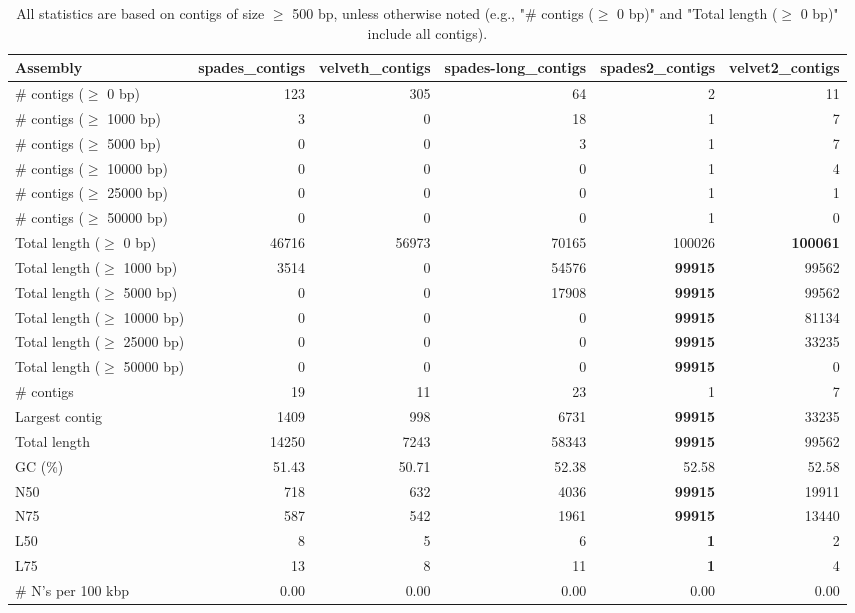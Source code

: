 \documentclass[12pt,a4paper]{article}
\begin{document}
\begin{table}[ht]
\begin{center}
\caption{All statistics are based on contigs of size $\geq$ 500 bp, unless otherwise noted (e.g., "\# contigs ($\geq$ 0 bp)" and "Total length ($\geq$ 0 bp)" include all contigs).}
\begin{tabular}{|l*{5}{|r}|}
\hline
Assembly & spades\_contigs & velveth\_contigs & spades-long\_contigs & spades2\_contigs & velvet2\_contigs \\ \hline
\# contigs ($\geq$ 0 bp) & 123 & 305 & 64 & 2 & 11 \\ \hline
\# contigs ($\geq$ 1000 bp) & 3 & 0 & 18 & 1 & 7 \\ \hline
\# contigs ($\geq$ 5000 bp) & 0 & 0 & 3 & 1 & 7 \\ \hline
\# contigs ($\geq$ 10000 bp) & 0 & 0 & 0 & 1 & 4 \\ \hline
\# contigs ($\geq$ 25000 bp) & 0 & 0 & 0 & 1 & 1 \\ \hline
\# contigs ($\geq$ 50000 bp) & 0 & 0 & 0 & 1 & 0 \\ \hline
Total length ($\geq$ 0 bp) & 46716 & 56973 & 70165 & 100026 & {\bf 100061} \\ \hline
Total length ($\geq$ 1000 bp) & 3514 & 0 & 54576 & {\bf 99915} & 99562 \\ \hline
Total length ($\geq$ 5000 bp) & 0 & 0 & 17908 & {\bf 99915} & 99562 \\ \hline
Total length ($\geq$ 10000 bp) & 0 & 0 & 0 & {\bf 99915} & 81134 \\ \hline
Total length ($\geq$ 25000 bp) & 0 & 0 & 0 & {\bf 99915} & 33235 \\ \hline
Total length ($\geq$ 50000 bp) & 0 & 0 & 0 & {\bf 99915} & 0 \\ \hline
\# contigs & 19 & 11 & 23 & 1 & 7 \\ \hline
Largest contig & 1409 & 998 & 6731 & {\bf 99915} & 33235 \\ \hline
Total length & 14250 & 7243 & 58343 & {\bf 99915} & 99562 \\ \hline
GC (\%) & 51.43 & 50.71 & 52.38 & 52.58 & 52.58 \\ \hline
N50 & 718 & 632 & 4036 & {\bf 99915} & 19911 \\ \hline
N75 & 587 & 542 & 1961 & {\bf 99915} & 13440 \\ \hline
L50 & 8 & 5 & 6 & {\bf 1} & 2 \\ \hline
L75 & 13 & 8 & 11 & {\bf 1} & 4 \\ \hline
\# N's per 100 kbp & 0.00 & 0.00 & 0.00 & 0.00 & 0.00 \\ \hline
\end{tabular}
\end{center}
\end{table}
\end{document}
